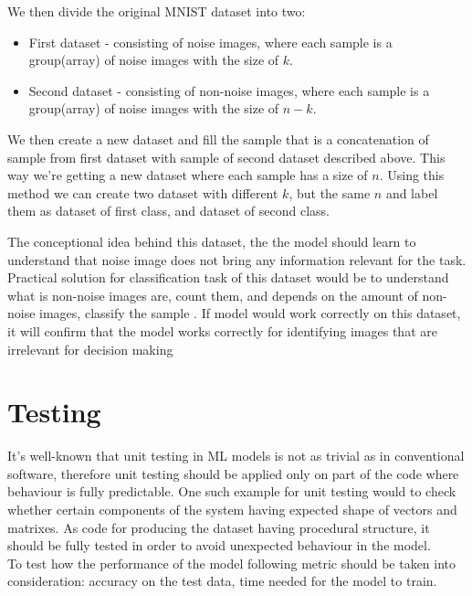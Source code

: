We then divide the original MNIST dataset into two:
\begin{itemize}
	\item First dataset - consisting of noise images, where each sample is a group(array)
		of noise images with the size of $k$.
	\item Second dataset - consisting of non-noise images, where each sample is a group(array)
		of noise images with the size of $n-k$.
\end{itemize}

We then create a new dataset and fill the sample that is a concatenation of sample
from first dataset with sample of second dataset described above.
This way we're getting a new dataset
where each sample has a size of $n$. Using this method we can create two dataset with
different $k$, but the same $n$ and label them as dataset of first class, and
dataset of second class.

The conceptional idea behind this dataset, the the model should learn to
understand that noise image does not bring any information relevant for the task.
Practical solution for classification task of this dataset would be
to understand what is non-noise images are,
count them, and depends on the amount of non-noise images,
classify the sample
. If model would work correctly on this dataset, it will confirm
 that the model works correctly
for identifying images that are irrelevant for decision making

\section{Testing}
It's well-known that unit testing in ML models is not as trivial
as in conventional software,
therefore unit testing should be applied only on part of the code where
behaviour is fully predictable. One such example for unit testing would to check whether
certain components of the system having expected shape of vectors and matrixes.
As code for producing the dataset having procedural structure,
it should be fully tested in order to avoid
unexpected behaviour in the model.
\\
To test how the performance of the model following metric should be taken into
consideration: accuracy on the test data, time needed for the model to train.


%
%

